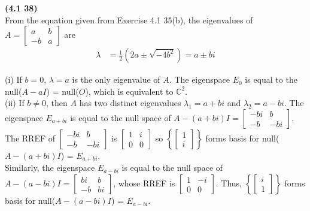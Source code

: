 \textbf{(4.1 38)} \\
From the equation given from Exercise 4.1 35(b), the eigenvalues of $A = \begin{bmatrix}
	a & b \\ -b & a
\end{bmatrix}$ are \begin{align*}
	\lambda &= \frac{1}{2}(2a \pm \sqrt{-4b^2}) = a \pm bi
\end{align*}

(i) If $b = 0$, $\lambda = a$ is the only eigenvalue of $A$. The eigenspace $E_0$ is equal to the null($A - aI$) = null($O$), which is equivalent to $\mathbb{C}^2$. \\

(ii) If $b \neq 0$, then $A$ has two distinct eigenvalues $\lambda_1 = a + bi$ and $\lambda_2 = a - bi$. The eigenspace $E_{a + bi}$ is equal to the null space of $A - (a+bi)I = \begin{bmatrix}
	-bi & b \\ -b & -bi
\end{bmatrix}$. The RREF of $\begin{bmatrix}
-bi & b \\ -b & -bi
\end{bmatrix}$ is $\begin{bmatrix}
	1 & i \\ 0 & 0
\end{bmatrix}$ so $\left \{ \begin{bmatrix}
	1 \\ i
\end{bmatrix} \right \}$ forms basis for null($A - (a+bi)I$) = $E_{a+bi}$. \\
Similarly, the eigenspace $E_{a-bi}$ is equal to the null space of $A - (a - bi)I = \begin{bmatrix}
	bi & b \\ -b & bi
\end{bmatrix}$, whose RREF is $\begin{bmatrix}
	1 & -i \\ 0 & 0
\end{bmatrix}$. Thus, $\left \{ \begin{bmatrix}
	i \\ 1
\end{bmatrix} \right \}$ forms basis for null($A - (a - bi)I$) = $E_{a-bi}$. \\

